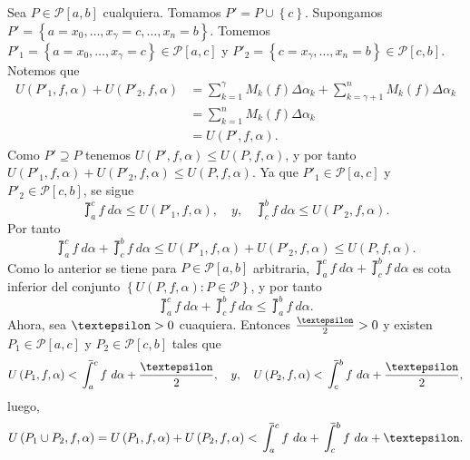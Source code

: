 Sea $P\in\mathcal{P}\left[a,b\right]$ cualquiera. Tomamos $P'=P\cup\left\lbrace c\right\rbrace$. Supongamos $P'=\left\lbrace a=x_0,\dots,x_\gamma=c,\dots,x_n=b\right\rbrace$. Tomemos $P'_1=\left\lbrace a=x_0,\dots,x_\gamma=c\right\rbrace\in\mathcal{P}\left[a,c\right]$ y $P'_2=\left\lbrace c=x_\gamma,\dots,x_n=b\right\rbrace\in\mathcal{P}\left[c,b\right]$. Notemos que
  \begin{align*}
  U\left(P'_1,f,\alpha\right)+U\left(P'_2,f,\alpha\right)&=\sum_{k=1}^{\gamma}M_k\left(f\right)\Delta\alpha_k+\sum_{k=\gamma+1}^{n}M_k\left(f\right)\Delta\alpha_k\\
  &=\sum_{k=1}^{n}M_k\left(f\right)\Delta\alpha_k\\
  &=U\left(P',f,\alpha\right).
  \end{align*}
  Como $P'\supseteq P$ tenemos $U\left(P',f,\alpha\right)\leq U\left(P,f,\alpha\right)$, y por tanto $U\left(P'_1,f,\alpha\right)+U\left(P'_2,f,\alpha\right)\leq U\left(P,f,\alpha\right)$. Ya que $P'_1\in\mathcal{P}\left[a,c\right]$ y $P'_2\in\mathcal{P}\left[c,b\right]$, se sigue
  \begin{equation*}
    \upint_a^c f\ d\alpha \leq U\left(P'_1,f,\alpha\right),\quad y,\quad \upint_c^b f\ d\alpha \leq U\left(P'_2,f,\alpha\right).
  \end{equation*}
  Por tanto
  \begin{equation*}
    \upint_a^c f\ d\alpha + \upint_c^b f\ d\alpha \leq U\left(P'_1,f,\alpha\right)+U\left(P'_2,f,\alpha\right)\leq U\left(P,f,\alpha\right).
  \end{equation*}
  Como lo anterior se tiene para $P\in\mathcal{P}\left[a,b\right]$ arbitraria, $\upint_a^c f\ d\alpha + \upint_c^b f\ d\alpha$ es cota inferior del conjunto $\left\lbrace U\left(P,f,\alpha\right):P\in\mathcal{P}\right\rbrace$, y por tanto
  \setcounter{equation}{0}
  \begin{equation}
    \upint_a^c f\ d\alpha + \upint_c^b f\ d\alpha \leq \upint_a^b f\ d\alpha.
  \end{equation}
  Ahora, sea $\text{\textepsilon}>0$ cuaquiera. Entonces $\frac{\text{\textepsilon}}{2}>0$ y existen $P_1\in\mathcal{P}\left[a,c\right]$ y $P_2\in\mathcal{P}\left[c,b\right]$ tales que
  \begin{equation*}
    U\left(P_1,f,\alpha\right)<\upint_a^c f\ d\alpha+\frac{\text{\textepsilon}}{2},\quad y,\quad U\left(P_2,f,\alpha\right)<\upint_c^b f\ d\alpha+\frac{\text{\textepsilon}}{2},
  \end{equation*}
  luego,
  \begin{equation*}
    U\left(P_1\cup P_2,f,\alpha\right) = U\left(P_1,f,\alpha\right)+U\left(P_2,f,\alpha\right) < \upint_a^c f\ d\alpha + \upint_c^b f\ d\alpha + \text{\textepsilon}.
  \end{equation*}
